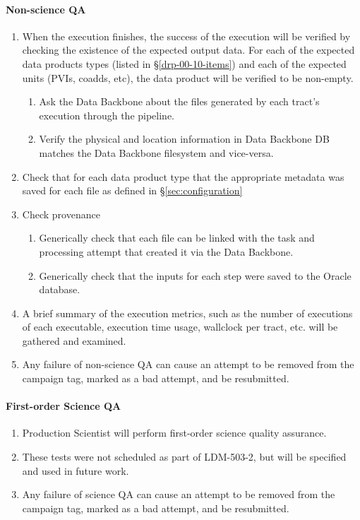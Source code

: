 \paragraph{Non-science QA}
\begin{enumerate}
  \item{When the execution finishes, the success of the execution will be verified by checking the existence of the expected output data.
  For each of the expected data products types (listed in \S\ref{drp-00-10-items})
  and each of the expected units (PVIs, coadds, etc), the data product will be
  verified to be non-empty.}
    \begin{enumerate}
        \item{Ask the Data Backbone about the files generated by each tract's execution through the pipeline.}
        \item{Verify the physical and location information in Data Backbone DB matches the Data Backbone filesystem and vice-versa.} 
    \end{enumerate}
  \item{Check that for each data product type that the appropriate metadata was saved for each file as defined in \S\ref{sec:configuration}}
  \item{Check provenance}
    \begin{enumerate}
        \item{Generically check that each file can be linked with the task and processing attempt that created it via the Data Backbone.}
        \item{Generically check that the inputs for each step were saved to the Oracle database.}
    \end{enumerate}
  \item{A brief summary of the execution metrics, such as the number of executions of each executable, execution time usage, wallclock per tract,
         etc. will be gathered and examined.}
  \item{Any failure of non-science QA can cause an attempt to be removed from the campaign tag, marked as a bad attempt, and be resubmitted.} 
\end{enumerate}

\paragraph{First-order Science QA}
\begin{enumerate}
  \item{Production Scientist will perform first-order science quality assurance.}
  \item{These tests were not scheduled as part of LDM-503-2, but will be specified and used in future work.}
  \item{Any failure of science QA can cause an attempt to be removed from the campaign tag, marked as a bad attempt, and be resubmitted.}
\end{enumerate}
